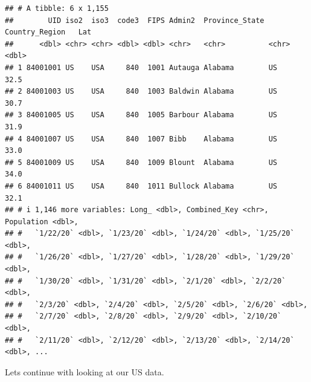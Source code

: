 \documentclass[
]{article}
\begin{document}
\begin{verbatim}
## # A tibble: 6 x 1,155
##        UID iso2  iso3  code3  FIPS Admin2  Province_State Country_Region   Lat
##      <dbl> <chr> <chr> <dbl> <dbl> <chr>   <chr>          <chr>          <dbl>
## 1 84001001 US    USA     840  1001 Autauga Alabama        US              32.5
## 2 84001003 US    USA     840  1003 Baldwin Alabama        US              30.7
## 3 84001005 US    USA     840  1005 Barbour Alabama        US              31.9
## 4 84001007 US    USA     840  1007 Bibb    Alabama        US              33.0
## 5 84001009 US    USA     840  1009 Blount  Alabama        US              34.0
## 6 84001011 US    USA     840  1011 Bullock Alabama        US              32.1
## # i 1,146 more variables: Long_ <dbl>, Combined_Key <chr>, Population <dbl>,
## #   `1/22/20` <dbl>, `1/23/20` <dbl>, `1/24/20` <dbl>, `1/25/20` <dbl>,
## #   `1/26/20` <dbl>, `1/27/20` <dbl>, `1/28/20` <dbl>, `1/29/20` <dbl>,
## #   `1/30/20` <dbl>, `1/31/20` <dbl>, `2/1/20` <dbl>, `2/2/20` <dbl>,
## #   `2/3/20` <dbl>, `2/4/20` <dbl>, `2/5/20` <dbl>, `2/6/20` <dbl>,
## #   `2/7/20` <dbl>, `2/8/20` <dbl>, `2/9/20` <dbl>, `2/10/20` <dbl>,
## #   `2/11/20` <dbl>, `2/12/20` <dbl>, `2/13/20` <dbl>, `2/14/20` <dbl>, ...
\end{verbatim}

Lets continue with looking at our US data.
\end{document}
